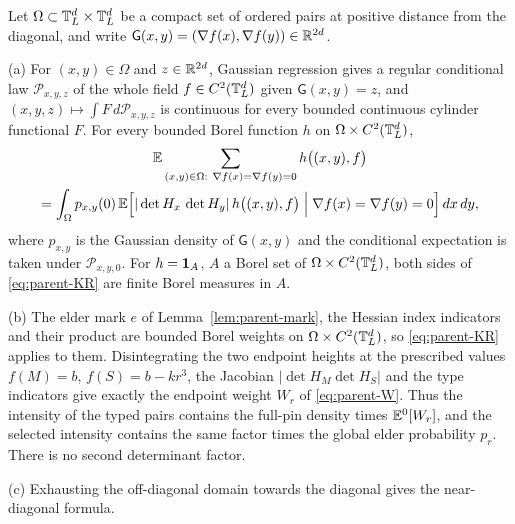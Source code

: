 \begin{proposition}\label{prop:parent-KR}
Let $\Omega\subset\mathbb T^d_L\times\mathbb T^d_L$ be a compact set of ordered pairs at positive distance from the diagonal, and write $\mathsf G(x,y)=(\nabla f(x),\nabla f(y))\in\mathbb R^{2d}$.

\textup{(a)} For $(x,y)\in\Omega$ and $z\in\mathbb R^{2d}$, Gaussian regression gives a regular conditional law $\mathcal P_{x,y,z}$ of the whole field $f\in C^2(\mathbb T^d_L)$ given $\mathsf G(x,y)=z$, and $(x,y,z)\mapsto\int F\,d\mathcal P_{x,y,z}$ is continuous for every bounded continuous cylinder functional $F$. For every bounded Borel function $h$ on $\Omega\times C^2(\mathbb T^d_L)$,
\begin{multline}\label{eq:parent-KR}
\mathbb E\sum_{(x,y)\in\Omega:\ \nabla f(x)=\nabla f(y)=0}h\bigl((x,y),f\bigr)\\
=\int_\Omega p_{x,y}(0)\,\mathbb E\Bigl[|\det H_x\,\det H_y|\,h\bigl((x,y),f\bigr)\Bigm|\nabla f(x)=\nabla f(y)=0\Bigr]\,dx\,dy,
\end{multline}
where $p_{x,y}$ is the Gaussian density of $\mathsf G(x,y)$ and the conditional expectation is taken under $\mathcal P_{x,y,0}$. For $h=\mathbf 1_A$, $A$ a Borel set of $\Omega\times C^2(\mathbb T^d_L)$, both sides of \eqref{eq:parent-KR} are finite Borel measures in $A$.

\textup{(b)} The elder mark $e$ of Lemma~\ref{lem:parent-mark}, the Hessian index indicators and their product are bounded Borel weights on $\Omega\times C^2(\mathbb T^d_L)$, so \eqref{eq:parent-KR} applies to them. Disintegrating the two endpoint heights at the prescribed values $f(M)=b$, $f(S)=b-kr^3$, the Jacobian $|\det H_M\det H_S|$ and the type indicators give exactly the endpoint weight $W_r$ of \eqref{eq:parent-W}. Thus the intensity of the typed pairs contains the full-pin density times $\mathbb E^0[W_r]$, and the selected intensity contains the same factor times the global elder probability $p_r$. There is no second determinant factor.

\textup{(c)} Exhausting the off-diagonal domain towards the diagonal gives the near-diagonal formula.
\end{proposition}

